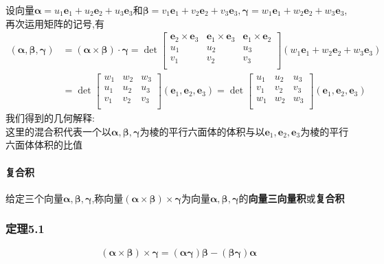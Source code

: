 \documentclass{article}
\newcommand{\ve}{\boldsymbol}
\begin{document}
\begin{CJK}{UTF8}{gkai}
设向量$\ve{\alpha}=u_1\ve{e}_1+u_2\ve{e}_2+u_3\ve{e}_3$和$\ve{\beta}=v_1\ve{e}_1+v_2\ve{e}_2+v_3\ve{e}_3,\ve{\gamma}=w_1\ve{e}_1+w_2\ve{e}_2+w_3\ve{e}_3$,再次运用矩阵的记号,有\\
\[
\begin{aligned}    
(\ve{\alpha},\ve{\beta},\ve{\gamma})&=(\ve{\alpha}\times\ve{\beta})\cdot\ve{\gamma}=\det
\begin{bmatrix}
    \ve{e}_2\times\ve{e}_3&\ve{e}_1\times\ve{e}_3&\ve{e}_1\times\ve{e}_2\\
    u_1&u_2&u_3\\
    v_1&v_2&v_3\\    
\end{bmatrix}
(w_1\ve{e}_1+w_2\ve{e}_2+w_3\ve{e}_3)\\
&=\det
\begin{bmatrix}
    w_1&w_2&w_3\\
    u_1&u_2&u_3\\
    v_1&v_2&v_3\\    
\end{bmatrix}
(\ve{e}_1,\ve{e}_2,\ve{e}_3)
=\det
\begin{bmatrix}
    u_1&u_2&u_3\\
    v_1&v_2&v_3\\    
    w_1&w_2&w_3\\
\end{bmatrix}
(\ve{e}_1,\ve{e}_2,\ve{e}_3)
\end{aligned}
\]
我们得到的几何解释:\\
这里的混合积代表一个以$\ve{\alpha},\ve{\beta},\ve{\gamma}$为棱的平行六面体的体积与以$\ve{e}_1,\ve{e}_2,\ve{e}_3$为棱的平行六面体体积的比值\\




\paragraph{复合积\\}
给定三个向量$\ve{\alpha},\ve{\beta},\ve{\gamma}$,称向量$(\ve{\alpha}\times\ve{\beta})\times\ve{\gamma}$为向量$\ve{\alpha},\ve{\beta},\ve{\gamma}$的\textbf{向量三向量积}或\textbf{复合积}\\
\subsubsection*{定理5.1}
\[(\ve{\alpha}\times\ve{\beta})\times\ve{\gamma}=(\ve{\alpha}\ve{\gamma})\ve{\beta}-(\ve{\beta}\ve{\gamma})\ve{\alpha}\]




\end{CJK}
\end{document}
